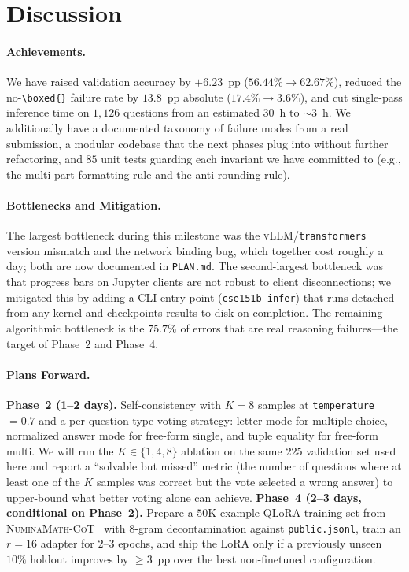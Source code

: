 \documentclass{article}
\begin{document}
\section{Discussion}
\label{sec:discussion}

\paragraph{Achievements.}
We have raised validation accuracy by $+6.23$~pp
($56.44\% \to 62.67\%$), reduced the no-\verb|\boxed{}| failure rate
by $13.8$~pp absolute ($17.4\% \to 3.6\%$), and cut single-pass
inference time on $1{,}126$ questions from an estimated $30$~h to
$\sim$$3$~h. We additionally have a documented taxonomy of failure
modes from a real submission, a modular codebase that the next phases
plug into without further refactoring, and $85$ unit tests guarding
each invariant we have committed to (e.g., the multi-part formatting
rule and the anti-rounding rule).

\paragraph{Bottlenecks and Mitigation.}
The largest bottleneck during this milestone was the
\textsc{vLLM}/\texttt{transformers} version mismatch and the network
binding bug, which together cost roughly a day; both are now
documented in \texttt{PLAN.md}. The second-largest bottleneck was that
progress bars on Jupyter clients are not robust to client
disconnections; we mitigated this by adding a CLI entry point
(\texttt{cse151b-infer}) that runs detached from any kernel and
checkpoints results to disk on completion. The remaining algorithmic
bottleneck is the $75.7\%$ of errors that are real reasoning
failures—the target of Phase~2 and Phase~4.

\paragraph{Plans Forward.}
\textbf{Phase~2 (1--2 days).} Self-consistency with $K=8$ samples at
\texttt{temperature}~$=0.7$ and a per-question-type voting strategy:
letter mode for multiple choice, normalized answer mode for free-form
single, and tuple equality for free-form multi. We will run the
$K \in \{1, 4, 8\}$ ablation on the same $225$ validation set used
here and report a ``solvable but missed'' metric (the number of
questions where at least one of the $K$ samples was correct but the
vote selected a wrong answer) to upper-bound what better voting alone
can achieve.
\textbf{Phase~4 (2--3 days, conditional on Phase~2).} Prepare a
$50$K-example QLoRA training set from
\textsc{NuminaMath-CoT}~\citep{numina2024} with $8$-gram
decontamination against \texttt{public.jsonl}, train an $r{=}16$
adapter for $2$--$3$ epochs, and ship the LoRA only if a previously
unseen $10\%$ holdout improves by $\geq 3$~pp over the best
non-finetuned configuration.
\end{document}
